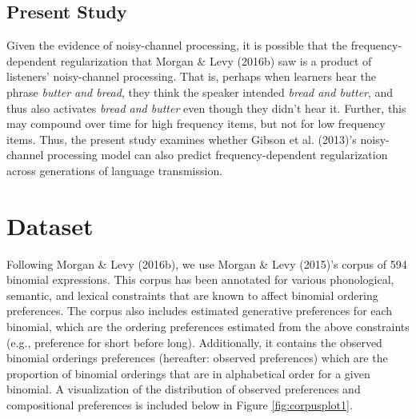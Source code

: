 \documentclass[10pt, letterpaper]{article}
\begin{document}
\hypertarget{present-study}{%
\subsection{Present Study}\label{present-study}}

Given the evidence of noisy-channel processing, it is possible that the
frequency-dependent regularization that Morgan \& Levy (2016b) saw is a
product of listeners' noisy-channel processing. That is, perhaps when
learners hear the phrase \emph{butter and bread}, they think the speaker
intended \emph{bread and butter}, and thus also activates \emph{bread
and butter} even though they didn't hear it. Further, this may compound
over time for high frequency items, but not for low frequency items.
Thus, the present study examines whether Gibson et al. (2013)'s
noisy-channel processing model can also predict frequency-dependent
regularization across generations of language transmission.

\hypertarget{dataset}{%
\section{Dataset}\label{dataset}}

Following Morgan \& Levy (2016b), we use Morgan \& Levy (2015)'s corpus
of 594 binomial expressions. This corpus has been annotated for various
phonological, semantic, and lexical constraints that are known to affect
binomial ordering preferences. The corpus also includes estimated
generative preferences for each binomial, which are the ordering
preferences estimated from the above constraints (e.g., preference for
short before long). Additionally, it contains the observed binomial
orderings preferences (hereafter: observed preferences) which are the
proportion of binomial orderings that are in alphabetical order for a
given binomial. A visualization of the distribution of observed
preferences and compositional preferences is included below in Figure
\ref{fig:corpusplot1}.
\end{document}

